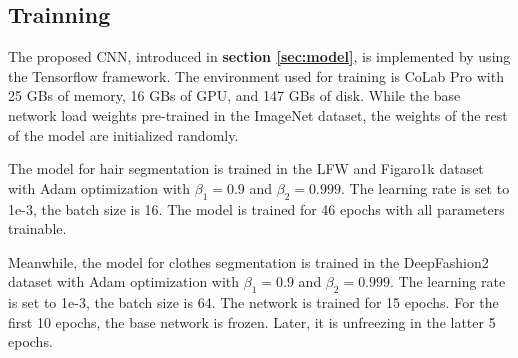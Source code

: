 \subsection{Trainning}

The proposed CNN, introduced in \textbf{section \ref{sec:model}}, is implemented by using the Tensorflow framework. The environment used for training is CoLab Pro with 25 GBs of memory, 16 GBs of GPU, and 147 GBs of disk. While the base network load weights pre-trained in the ImageNet dataset, the weights of the rest of the model are initialized randomly.
\par 
The model for hair segmentation is trained in the LFW and Figaro1k dataset with Adam optimization with $\beta_{1} = 0.9$ and $\beta_{2} = 0.999$. The learning rate is set to 1e-3, the batch size is 16. The model is trained for 46 epochs with all parameters trainable.
\par
Meanwhile, the model for clothes segmentation is trained in the DeepFashion2 dataset with Adam optimization with $\beta_{1} = 0.9$ and $\beta_{2} = 0.999$. The learning rate is set to 1e-3, the batch size is 64. The network is trained for 15 epochs. For the first 10 epochs, the base network is frozen. Later, it is unfreezing in the latter 5 epochs.
\par
